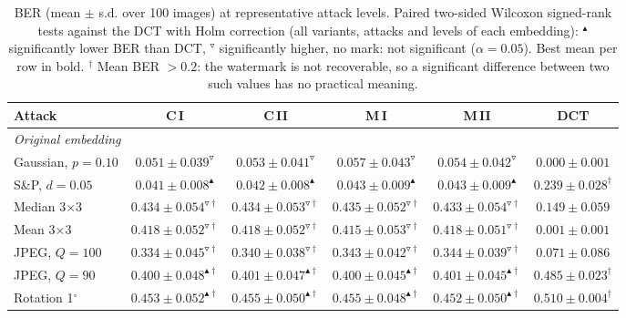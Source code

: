 \begin{table}[t]
\centering
\caption{BER (mean $\pm$ s.d. over 100 images) at representative attack levels. Paired two-sided Wilcoxon signed-rank tests against the DCT with Holm correction (all variants, attacks and levels of each embedding): $^{\blacktriangle}$ significantly lower BER than DCT, $^{\triangledown}$ significantly higher, no mark: not significant ($\alpha=0.05$). Best mean per row in bold. $^{\dagger}$ Mean BER $>0.2$: the watermark is not recoverable, so a significant difference between two such values has no practical meaning.}
\label{tab:ablation_statistics}
\footnotesize
\setlength{\tabcolsep}{2pt}
\begin{tabular}{lccccc}
\toprule
Attack & C\,I & C\,II & M\,I & M\,II & DCT \\
\midrule
\multicolumn{6}{l}{\emph{Original embedding}} \\
Gaussian, $p=0.10$ & $0.051 \pm 0.039^{\triangledown}$ & $0.053 \pm 0.041^{\triangledown}$ & $0.057 \pm 0.043^{\triangledown}$ & $0.054 \pm 0.042^{\triangledown}$ & $\mathbf{0.000 \pm 0.001}$ \\
S\&P, $d=0.05$ & $\mathbf{0.041 \pm 0.008}^{\blacktriangle}$ & $0.042 \pm 0.008^{\blacktriangle}$ & $0.043 \pm 0.009^{\blacktriangle}$ & $0.043 \pm 0.009^{\blacktriangle}$ & $0.239 \pm 0.028^{\dagger}$ \\
Median 3$\times$3 & $0.434 \pm 0.054^{\triangledown\dagger}$ & $0.434 \pm 0.053^{\triangledown\dagger}$ & $0.435 \pm 0.052^{\triangledown\dagger}$ & $0.433 \pm 0.054^{\triangledown\dagger}$ & $\mathbf{0.149 \pm 0.059}$ \\
Mean 3$\times$3 & $0.418 \pm 0.052^{\triangledown\dagger}$ & $0.418 \pm 0.052^{\triangledown\dagger}$ & $0.415 \pm 0.053^{\triangledown\dagger}$ & $0.418 \pm 0.051^{\triangledown\dagger}$ & $\mathbf{0.001 \pm 0.001}$ \\
JPEG, $Q=100$ & $0.334 \pm 0.045^{\triangledown\dagger}$ & $0.340 \pm 0.038^{\triangledown\dagger}$ & $0.343 \pm 0.042^{\triangledown\dagger}$ & $0.344 \pm 0.039^{\triangledown\dagger}$ & $\mathbf{0.071 \pm 0.086}$ \\
JPEG, $Q=90$ & $0.400 \pm 0.048^{\blacktriangle\dagger}$ & $0.401 \pm 0.047^{\blacktriangle\dagger}$ & $\mathbf{0.400 \pm 0.045}^{\blacktriangle\dagger}$ & $0.401 \pm 0.045^{\blacktriangle\dagger}$ & $0.485 \pm 0.023^{\dagger}$ \\
Rotation 1$^\circ$ & $0.453 \pm 0.052^{\blacktriangle\dagger}$ & $0.455 \pm 0.050^{\blacktriangle\dagger}$ & $0.455 \pm 0.048^{\blacktriangle\dagger}$ & $\mathbf{0.452 \pm 0.050}^{\blacktriangle\dagger}$ & $0.510 \pm 0.004^{\dagger}$ \\

\end{tabular}
\end{table}
